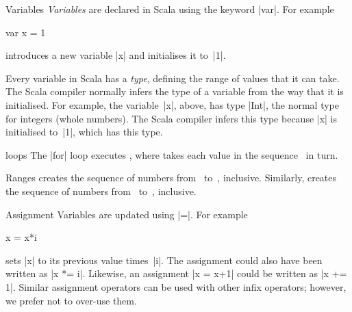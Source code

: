 
\begin{scalaBox}{Variables}
\label{sb:variables}
\emph{Variables} are declared in Scala using the keyword |var|.  For example
\begin{scala}
  var x = 1
\end{scala}
introduces a new variable |x| and initialises it to~|1|.

Every variable in Scala has a \emph{type}, defining the range of values that
it can take.  The Scala compiler normally infers the type of a variable from
the way that it is initialised.  For example, the variable~|x|, above, has
type |Int|, the normal type for integers (whole numbers).  The Scala compiler
infers this type because |x| is initialised to~|1|, which has this type.  %
%
\end{scalaBox}


\begin{scalaBox}{ loops}
\label{sb:for-loop}
The |for| loop  executes , where 
takes each value in the sequence~ in turn.
\end{scalaBox}


\begin{scalaBox}{Ranges}
\label{sb:ranges}
 creates the sequence of numbers from~
to~, inclusive.
Similarly,  creates the sequence of numbers from~
to~, inclusive.
\end{scalaBox}


\begin{scalaBox}{Assignment}
\label{sb:assignment}
Variables are updated using |=|.  For example
\begin{scala}
  x = x*i
\end{scala}
sets |x| to its previous value times~|i|.  
%
The assignment could also have been written as |x *= i|.  Likewise, an
assignment |x = x+1| could be written as |x += 1|.  Similar assignment
operators can be used with other infix operators; however, we prefer not to
over-use them.
\end{scalaBox}

